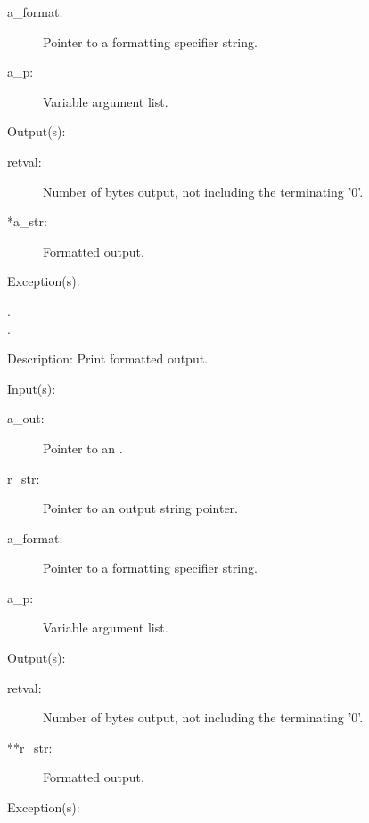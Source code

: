 \begin{capi}
\begin{capilist}
\begin{description}
		\item[a\_format: ]
			Pointer to a formatting specifier string.
		\item[a\_p: ]
			Variable argument list.
		\end{description}
	\item[Output(s): ]
		\begin{description}\item[]
		\item[retval: ]
			Number of bytes output, not including the terminating
			'{\bs}0'.
		\item[*a\_str: ]
			Formatted output.
		\end{description}
	\item[Exception(s): ]
		\begin{description}\item[]
		\item[.]
		\item[.]
		\end{description}
	\item[Description: ]
		Print formatted output.
	\end{capilist}
\label{out_put_sva}
	\begin{capilist}
	\item[Input(s): ]
		\begin{description}\item[]
		\item[a\_out: ]
			Pointer to an .
		\item[r\_str: ]
			Pointer to an output string pointer.
		\item[a\_format: ]
			Pointer to a formatting specifier string.
		\item[a\_p: ]
			Variable argument list.
		\end{description}
	\item[Output(s): ]
		\begin{description}\item[]
		\item[retval: ]
			Number of bytes output, not including the terminating
			'{\bs}0'.
		\item[**r\_str: ]
			Formatted output.
		\end{description}
	\item[Exception(s): ]

\end{capilist}
\end{capi}
